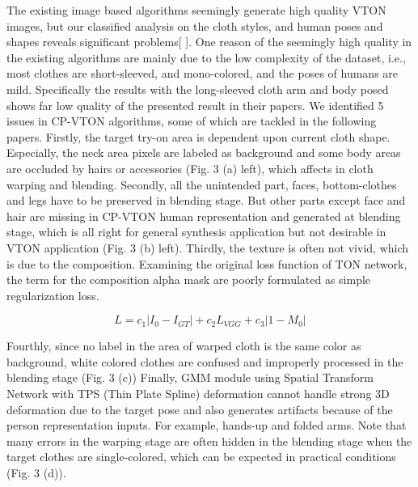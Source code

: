 The existing image based algorithms seemingly generate high quality VTON images, but our classified analysis on the cloth styles, and human poses and shapes reveals significant problems[  ]. One reason of the seemingly high quality in the existing algorithms are mainly due to the low complexity of the dataset, i.e., most clothes are short-sleeved, and mono-colored, and the poses of humans are mild. Specifically the results with the long-sleeved cloth arm and body posed shows far low quality of the presented result in their papers. We identified 5 issues in CP-VTON\cite{Wang2018TowardCI} algorithms, some of which are tackled in the following papers. Firstly, the target try-on area is dependent upon current cloth shape. Especially, the neck area pixels are labeled as background and some body areas are occluded by hairs or accessories (Fig. 3 (a) left), which affects in cloth warping and blending. Secondly, all the unintended part, faces, bottom-clothes and legs have to be preserved in blending stage. But other parts except face and hair are missing in CP-VTON\cite{Wang2018TowardCI} human representation and generated at blending stage, which is all right for general synthesis application but not desirable in VTON application (Fig. 3 (b) left). Thirdly, the texture is often not vivid, which is due to the composition. Examining the original loss function of TON network, the term for the composition alpha mask are poorly formulated as simple regularization loss.   

\begin{equation}
L = c_1 | I_0-I_{GT} |+  c_2 L_{VGG}+c_3 |1-M_0 |        
\end{equation} 

Fourthly, since no label in the area of warped cloth is the same color as background, white colored clothes are confused and improperly processed in the blending stage (Fig. 3 (c))
Finally, GMM module using Spatial Transform Network\cite{JaderbergSZK15} with TPS (Thin Plate Spline)\cite{Bookstein1989PrincipalWT} deformation cannot handle strong 3D deformation due to the target pose and also generates artifacts because of the person representation inputs. For example, hands-up and folded arms.  Note that many errors in the warping stage are often hidden in the blending stage when the target clothes are single-colored, which can be expected in practical conditions (Fig. 3 (d)).

